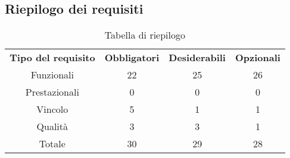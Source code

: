 \subsection{Riepilogo dei requisiti}
\begin{table}[h]
\centering
\begin{tabular}{| c | c | c | c |}
		\rowcolor{LightBlue}
		\color{white}\bfseries Tipo del requisito & \color{white}\bfseries Obbligatori & \color{white}\bfseries Desiderabili & \color{white}\bfseries Opzionali \\[0.25cm]
		 Funzionali & 22 & 25 & 26 \\
		 Prestazionali & 0 & 0 & 0 \\
		 Vincolo & 5 & 1 & 1 \\
		 Qualità & 3 & 3 & 1 \\
		 Totale & 30 & 29 & 28 \\ \hline
\end{tabular}
		\caption{Tabella di riepilogo}
\end{table}


\newpage